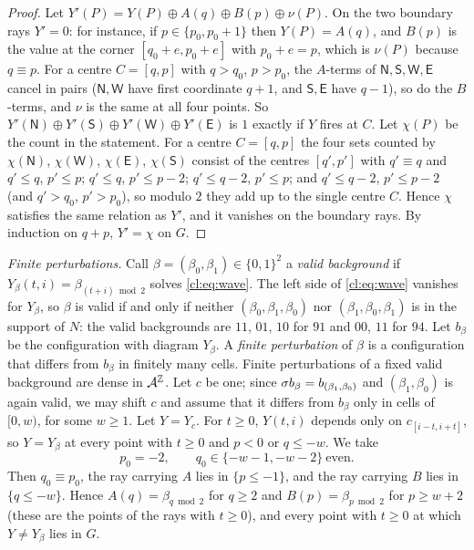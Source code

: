\begin{proof}
Let $Y'(P)=Y(P)\oplus A(q)\oplus B(p)\oplus\nu(P)$. On the two boundary rays $Y'=0$: for instance, if $p\in\{p_0,p_0+1\}$ then $Y(P)=A(q)$, and $B(p)$ is the value at the corner $[q_0+e,p_0+e]$ with $p_0+e=p$, which is $\nu(P)$ because $q\equiv p$. For a centre $C=[q,p]$ with $q>q_0$, $p>p_0$, the $A$-terms of $\mathsf N,\mathsf S,\mathsf W,\mathsf E$ cancel in pairs ($\mathsf N,\mathsf W$ have first coordinate $q+1$, and $\mathsf S,\mathsf E$ have $q-1$), so do the $B$-terms, and $\nu$ is the same at all four points. So $Y'(\mathsf N)\oplus Y'(\mathsf S)\oplus Y'(\mathsf W)\oplus Y'(\mathsf E)$ is $1$ exactly if $Y$ fires at $C$. Let $\chi(P)$ be the count in the statement. For a centre $C=[q,p]$ the four sets counted by $\chi(\mathsf N)$, $\chi(\mathsf W)$, $\chi(\mathsf E)$, $\chi(\mathsf S)$ consist of the centres $[q',p']$ with $q'\equiv q$ and $q'\le q$, $p'\le p$; $q'\le q$, $p'\le p-2$; $q'\le q-2$, $p'\le p$; and $q'\le q-2$, $p'\le p-2$ (and $q'>q_0$, $p'>p_0$), so modulo $2$ they add up to the single centre $C$. Hence $\chi$ satisfies the same relation as $Y'$, and it vanishes on the boundary rays. By induction on $q+p$, $Y'=\chi$ on $G$.
\end{proof}

\emph{Finite perturbations.} Call $\beta=(\beta_0,\beta_1)\in\{0,1\}^2$ a \emph{valid background} if $Y_\beta(t,i)=\beta_{(t+i)\bmod2}$ solves \eqref{cl:eq:wave}. The left side of \eqref{cl:eq:wave} vanishes for $Y_\beta$, so $\beta$ is valid if and only if neither $(\beta_0,\beta_1,\beta_0)$ nor $(\beta_1,\beta_0,\beta_1)$ is in the support of $N$: the valid backgrounds are $11$, $01$, $10$ for $91$ and $00$, $11$ for $94$. Let $b_\beta$ be the configuration with diagram $Y_\beta$. A \emph{finite perturbation} of $\beta$ is a configuration that differs from $b_\beta$ in finitely many cells. Finite perturbations of a fixed valid background are dense in $\mathcal{A}^{\mathbb{Z}}$. Let $c$ be one; since $\sigma b_\beta=b_{(\beta_1,\beta_0)}$ and $(\beta_1,\beta_0)$ is again valid, we may shift $c$ and assume that it differs from $b_\beta$ only in cells of $[0,w)$, for some $w\ge1$. Let $Y=Y_c$. For $t\ge0$, $Y(t,i)$ depends only on $c_{[i-t,i+t]}$, so $Y=Y_\beta$ at every point with $t\ge0$ and $p<0$ or $q\le-w$. We take
\[
p_0=-2,\qquad q_0\in\{-w-1,-w-2\}\ \text{even}.
\]
Then $q_0\equiv p_0$, the ray carrying $A$ lies in $\{p\le-1\}$, and the ray carrying $B$ lies in $\{q\le-w\}$. Hence $A(q)=\beta_{q\bmod2}$ for $q\ge2$ and $B(p)=\beta_{p\bmod2}$ for $p\ge w+2$ (these are the points of the rays with $t\ge0$), and every point with $t\ge0$ at which $Y\ne Y_\beta$ lies in $G$.

